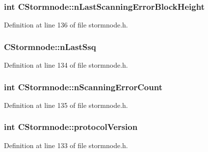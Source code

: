 \subsubsection[{n\+Last\+Scanning\+Error\+Block\+Height}]{\setlength{\rightskip}{0pt plus 5cm}int C\+Stormnode\+::n\+Last\+Scanning\+Error\+Block\+Height}\label{class_c_stormnode_a632651553ac07fe57ceea55049eb430f}


Definition at line 136 of file stormnode.\+h.

\hypertarget{class_c_stormnode_ac74bbfb73c657430dba45308a6f7a013}{}
\subsubsection[{n\+Last\+Ssq}]{ C\+Stormnode\+::n\+Last\+Ssq}\label{class_c_stormnode_ac74bbfb73c657430dba45308a6f7a013}


Definition at line 134 of file stormnode.\+h.

\hypertarget{class_c_stormnode_a2f9e003508853f529c9ef70babe35fc0}{}
\subsubsection[{n\+Scanning\+Error\+Count}]{\setlength{\rightskip}{0pt plus 5cm}int C\+Stormnode\+::n\+Scanning\+Error\+Count}\label{class_c_stormnode_a2f9e003508853f529c9ef70babe35fc0}


Definition at line 135 of file stormnode.\+h.

\hypertarget{class_c_stormnode_aa2baa2da552179c9812730d4d9709502}{}
\subsubsection[{protocol\+Version}]{\setlength{\rightskip}{0pt plus 5cm}int C\+Stormnode\+::protocol\+Version}\label{class_c_stormnode_aa2baa2da552179c9812730d4d9709502}


Definition at line 133 of file stormnode.\+h.

\hypertarget{class_c_stormnode_af241ab789726de5ba5d2caba082c3d01}{}
